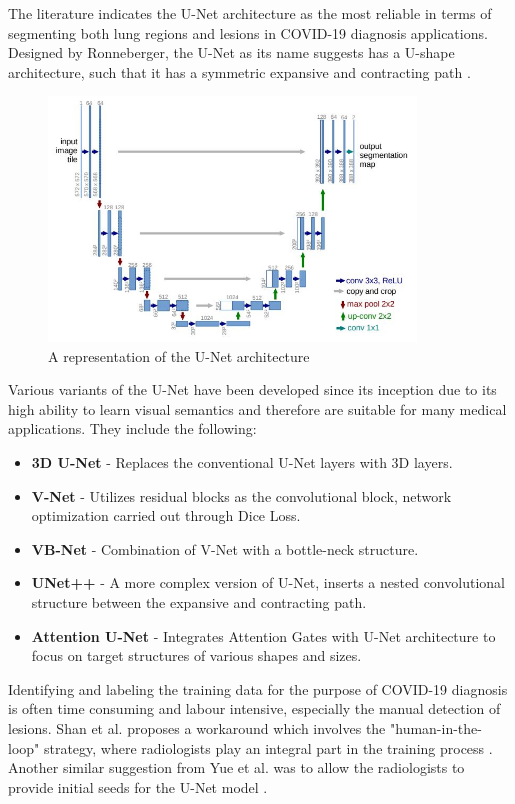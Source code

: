 The literature indicates the U-Net architecture as the most reliable in 
terms of segmenting both lung regions and lesions in COVID-19 diagnosis 
applications. Designed by Ronneberger, the U-Net as its name suggests has a U-shape architecture, 
such that it has a symmetric expansive and contracting path \cite{RFT2015}.

\begin{figure}[H]
    \centering
    \includegraphics[height=6.5cm]{Images/UNet.JPG}
    \decoRule
    \caption[U-Net Architecture]{A representation of the U-Net architecture \cite{RFT2015}}
    \label{fig:U-Net Architecture}
    \end{figure}
\vspace{-2em}
Various variants of the U-Net have been developed since its inception due to its high ability to learn visual semantics and therefore are suitable 
for many medical applications. They include the following:
\begin{itemize}
    \item \textbf{3D U-Net} - Replaces the conventional U-Net layers with 3D layers. \cite{SCS+2020}
    \item \textbf{V-Net} - Utilizes residual blocks as the convolutional block, network optimization carried out through Dice Loss. \cite{MNA+2020}
    \item \textbf{VB-Net} - Combination of V-Net with a bottle-neck structure. \cite{SFY+2020}
    \item \textbf{UNet++} - A more complex version of U-Net, inserts a nested convolutional structure between the expansive and contracting path. \cite{ZSM+2020}
    \item \textbf{Attention U-Net} - Integrates Attention Gates with U-Net architecture to focus on target structures of various shapes and sizes. \cite{OSF+2020}
\end{itemize}

Identifying and labeling the training data for the purpose of COVID-19 diagnosis is often 
time consuming and labour intensive, especially the manual detection of lesions. Shan et al. proposes a workaround which involves the "human-in-the-loop" strategy, 
where radiologists play an integral part in the training process \cite{SFY+2020}. Another similar suggestion from Yue et al. was to allow the radiologists to provide initial seeds for the U-Net  model \cite{YHQ+2020}.

